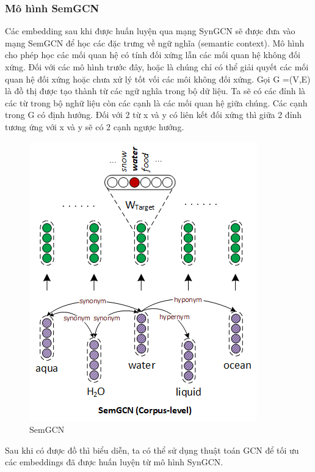 \subsubsection{Mô hình SemGCN}

Các embedding sau khi được huấn luyện qua mạng SynGCN sẽ được đưa vào mạng SemGCN để học các đặc trưng về ngữ nghĩa (semantic context). Mô hình cho phép học các mối quan hệ có tính đối xứng lẫn các mối quan hệ không đối xứng. Đối với các mô hình trước đây, hoặc là chúng chỉ có thể giải quyết các mối quan hệ đối xứng hoặc chưa xử lý tốt vối các môi không đối xứng. Gọi G =(V,E) là đồ thị được tạo thành từ các ngữ nghĩa trong bộ dữ liệu. Ta sẽ có các đỉnh là các từ trong bộ nghữ liệu còn các cạnh là các mối quan hệ giữa chúng. Các cạnh trong G có định hướng. Đối với 2 từ x và y có liên kết đối xứng thì giữa 2 đỉnh tương ứng với x và y sẽ có 2 cạnh ngược hướng.

\begin{figure}[H]
    \begin{center}
        \includegraphics[scale=1.0]{images/semgcn_model}
        \caption{SemGCN}
        \label{fig:semgcn}
    \end{center}
\end{figure}


Sau khi có được đồ thì biểu diễn, ta có thể sử dụng thuật toán GCN để tối ưu các embeddings đã được huấn luyện từ mô hình SynGCN.